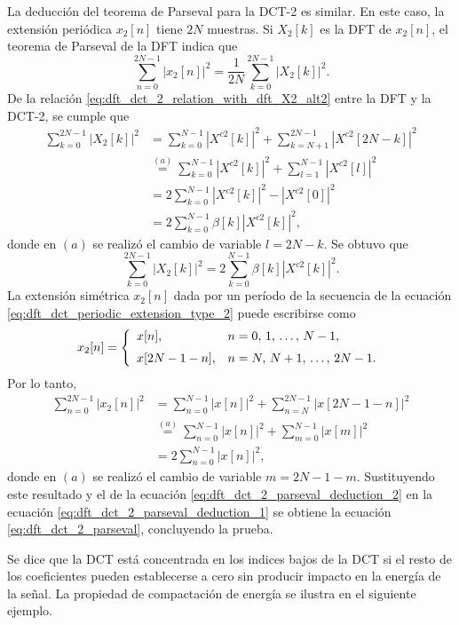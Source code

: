 \documentclass[a4paper]{report}
\begin{document}
La deducción del teorema de Parseval para la DCT-2 es similar. En este caso, la extensión periódica \(x_2[n]\) tiene \(2N\) muestras. Si \(X_2[k]\) es la DFT de \(x_2[n]\), el teorema de Parseval de la DFT indica que 
\begin{equation}\label{eq:dft_dct_2_parseval_deduction_1}
 \sum_{n=0}^{2N-1}|x_2[n]|^2=\frac{1}{2N}\sum_{k=0}^{2N-1}|X_2[k]|^2.
\end{equation}
De la relación \ref{eq:dft_dct_2_relation_with_dft_X2_alt2} entre la DFT y la DCT-2, se cumple que 
\begin{align*}
 \sum_{k=0}^{2N-1}|X_2[k]|^2&=\sum_{k=0}^{N-1}|X^{c2}[k]|^2+\sum_{k=N+1}^{2N-1}|X^{c2}[2N-k]|^2\\
  &\overset{(a)}{=}\sum_{k=0}^{N-1}|X^{c2}[k]|^2+\sum_{l=1}^{N-1}|X^{c2}[l]|^2\\
  &=2\sum_{k=0}^{N-1}|X^{c2}[k]|^2-|X^{c2}[0]|^2\\
  &=2\sum_{k=0}^{N-1}\beta[k]|X^{c2}[k]|^2,
\end{align*}
donde en \((a)\) se realizó el cambio de variable \(l=2N-k\). Se obtuvo que 
\begin{equation}\label{eq:dft_dct_2_parseval_deduction_2}
 \sum_{k=0}^{2N-1}|X_2[k]|^2=2\sum_{k=0}^{N-1}\beta[k]|X^{c2}[k]|^2.
\end{equation}
La extensión simétrica \(x_2[n]\) dada por un período de la secuencia de la ecuación \ref{eq:dft_dct_periodic_extension_type_2} puede escribirse como
\[
  x_2[n]=
 \left\{ 
 \begin{array}{ll}
  x[n],& n=0,\,1,\,\dots,\,N-1,\\[\medskipamount]
  x[2N-1-n],& n=N,\,N+1,\,\dots,\,2N-1.
 \end{array}
 \right.
\]
Por lo tanto,
\begin{align*}
 \sum_{n=0}^{2N-1}|x_2[n]|^2&=\sum_{n=0}^{N-1}|x[n]|^2+\sum_{n=N}^{2N-1}|x[2N-1-n]|^2\\
  &\overset{(a)}{=}\sum_{n=0}^{N-1}|x[n]|^2+\sum_{m=0}^{N-1}|x[m]|^2\\
  &=2\sum_{n=0}^{N-1}|x[n]|^2,
\end{align*}
donde en \((a)\) se realizó el cambio de variable \(m=2N-1-m\). Sustituyendo este resultado y el de la ecuación \ref{eq:dft_dct_2_parseval_deduction_2} en la ecuación \ref{eq:dft_dct_2_parseval_deduction_1} se obtiene la ecuación \ref{eq:dft_dct_2_parseval}, concluyendo la prueba. 

Se dice que la DCT está concentrada en los indices bajos de la DCT si el resto de los coeficientes pueden establecerse a cero sin producir impacto en la energía de la señal. La propiedad de compactación de energía se ilustra en el siguiente ejemplo.
\end{document}
